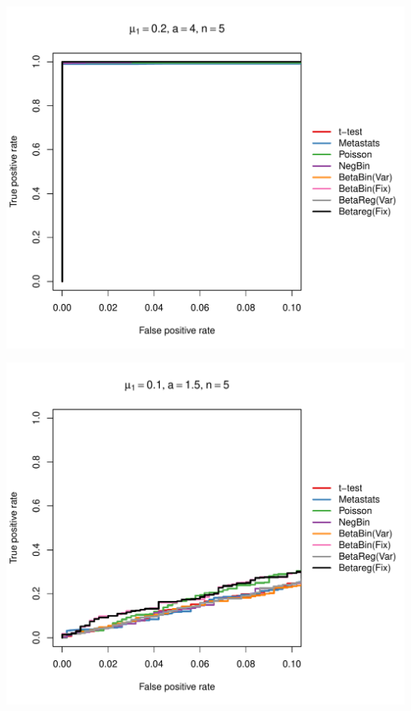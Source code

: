 \documentclass[12pt]{article}\usepackage{graphicx, color}
\makeatletter
\def\maxwidth{ %
  \ifdim\Gin@nat@width>\linewidth
    \linewidth
  \else
    \Gin@nat@width
  \fi
}
\newenvironment{knitrout}{}{} %
\makeatother
\begin{document}
\begin{knitrout}
{}




{\centering \includegraphics[width=\maxwidth]{figure/rocs3} 

}




{\centering \includegraphics[width=\maxwidth]{figure/rocs4} 

}





\end{knitrout}
\end{document}
